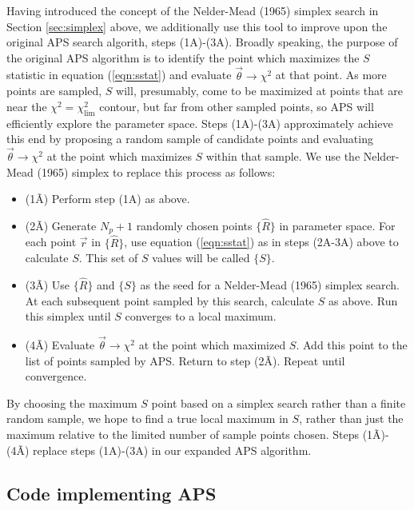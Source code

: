 \documentclass[useAMS,usenatbib]{aastex}
\begin{document}
{\bf %

Having introduced the concept of the Nelder-Mead (1965) simplex search in
Section \ref{sec:simplex} above, we additionally use this tool to improve upon
the original APS search algorith, steps (1A)-(3A).  Broadly speaking, the
purpose of the original APS algorithm is to identify the point which maximizes
the $S$ statistic in equation (\ref{eqn:sstat}) and evaluate
$\vec{\theta}\rightarrow\chi^2$ at that point.  As more points are sampled, $S$
will, presumably, come to be maximized at points that are near the
$\chi^2=\chi^2_\text{lim}$ contour, but far from other sampled points, so APS
will efficiently explore the parameter space.  Steps (1A)-(3A) approximately
achieve this end by proposing a random sample of candidate points and evaluating
$\vec{\theta}\rightarrow\chi^2$ at the point which maximizes $S$ within that
sample.  We use the Nelder-Mead (1965) simplex to replace this process as follows:
\begin{itemize}
\item(1\~A) Perform step (1A) as above.
\\
\item(2\~A) Generate $N_p+1$ randomly chosen points $\{\hat{R}\}$ in parameter space.  
For each point $\vec{r}$ in $\{\hat{R}\}$, use equation (\ref{eqn:sstat}) as in steps 
(2A-3A) above to calculate $S$.  This set of $S$ values will be called
$\{S\}$.
\\
\item(3\~A) Use $\{\hat{R}\}$ and $\{S\}$ as the seed for a
Nelder-Mead (1965) simplex search.  At each subsequent point sampled by this
search, calculate $S$ as above.  Run this simplex until $S$ converges to a local maximum.
\\
\item(4\~A) Evaluate $\vec{\theta}\rightarrow\chi^2$ at the point which
maximized $S$.  Add this point to the list of points sampled by APS.  Return to
step (2\~A).  Repeat until convergence.
\end{itemize}
By choosing the maximum $S$ point based on a simplex search rather than a
finite random sample, we hope to find a true local maximum in $S$, rather than
just the maximum relative to the limited number of sample points chosen.  Steps
(1\~A)-(4\~A) replace steps (1A)-(3A) in our expanded APS algorithm.

} %

\subsection{Code implementing APS}
\label{sec:user}
\end{document}
